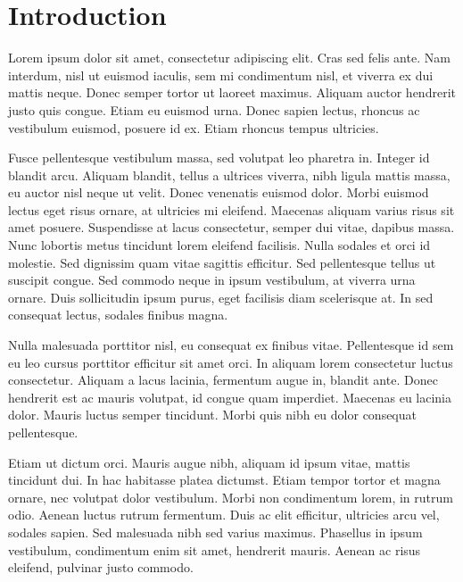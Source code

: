 \documentclass[linenumbers,RNAAS,trackchanges]{aastex631}
\begin{document}
\section{Introduction} \label{sec:intro}
Lorem ipsum dolor sit amet, consectetur adipiscing elit. Cras sed felis ante. Nam interdum, nisl ut euismod iaculis, sem mi condimentum nisl, et viverra ex dui mattis neque. Donec semper tortor ut laoreet maximus. Aliquam auctor hendrerit justo quis congue. Etiam eu euismod urna. Donec sapien lectus, rhoncus ac vestibulum euismod, posuere id ex. Etiam rhoncus tempus ultricies.

Fusce pellentesque vestibulum massa, sed volutpat leo pharetra in. Integer id blandit arcu. Aliquam blandit, tellus a ultrices viverra, nibh ligula mattis massa, eu auctor nisl neque ut velit. Donec venenatis euismod dolor. Morbi euismod lectus eget risus ornare, at ultricies mi eleifend. Maecenas aliquam varius risus sit amet posuere. Suspendisse at lacus consectetur, semper dui vitae, dapibus massa. Nunc lobortis metus tincidunt lorem eleifend facilisis. Nulla sodales et orci id molestie. Sed dignissim quam vitae sagittis efficitur. Sed pellentesque tellus ut suscipit congue. Sed commodo neque in ipsum vestibulum, at viverra urna ornare. Duis sollicitudin ipsum purus, eget facilisis diam scelerisque at. In sed consequat lectus, sodales finibus magna.

Nulla malesuada porttitor nisl, eu consequat ex finibus vitae. Pellentesque id sem eu leo cursus porttitor efficitur sit amet orci. In aliquam lorem consectetur luctus consectetur. Aliquam a lacus lacinia, fermentum augue in, blandit ante. Donec hendrerit est ac mauris volutpat, id congue quam imperdiet. Maecenas eu lacinia dolor. Mauris luctus semper tincidunt. Morbi quis nibh eu dolor consequat pellentesque.

Etiam ut dictum orci. Mauris augue nibh, aliquam id ipsum vitae, mattis tincidunt dui. In hac habitasse platea dictumst. Etiam tempor tortor et magna ornare, nec volutpat dolor vestibulum. Morbi non condimentum lorem, in rutrum odio. Aenean luctus rutrum fermentum. Duis ac elit efficitur, ultricies arcu vel, sodales sapien. Sed malesuada nibh sed varius maximus. Phasellus in ipsum vestibulum, condimentum enim sit amet, hendrerit mauris. Aenean ac risus eleifend, pulvinar justo commodo.
\end{document}
